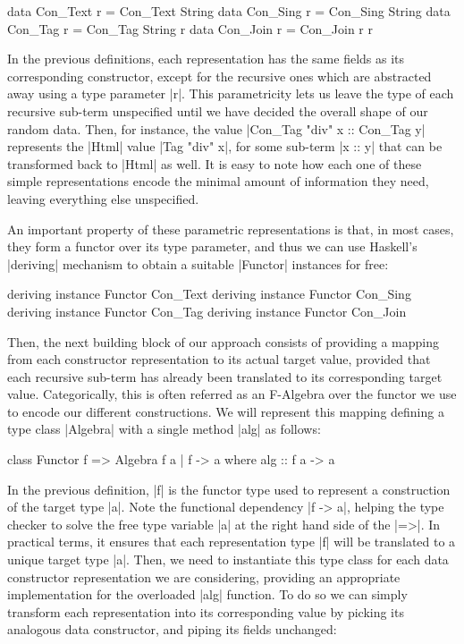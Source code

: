 \begin{code}
data Con_Text   r = Con_Text  String
data Con_Sing   r = Con_Sing  String
data Con_Tag    r = Con_Tag   String r
data Con_Join   r = Con_Join  r r
\end{code}
%
In the previous definitions, each representation has the same fields as its
corresponding constructor, except for the recursive ones which are abstracted
away using a type parameter |r|.
%
This parametricity lets us leave the type of each recursive sub-term unspecified
until we have decided the overall shape of our random data.
%
Then, for instance, the value |Con_Tag "div" x :: Con_Tag y| represents the
|Html| value |Tag "div" x|, for some sub-term |x :: y| that can be transformed
back to |Html| as well.
%
It is easy to note how each one of these simple representations encode the
minimal amount of information they need, leaving everything else unspecified.

An important property of these parametric representations is that, in most
cases, they form a functor over its type parameter, and thus we can use
Haskell's |deriving| mechanism to obtain a suitable |Functor| instances for
free:

\begin{code}
deriving instance Functor Con_Text
deriving instance Functor Con_Sing
deriving instance Functor Con_Tag
deriving instance Functor Con_Join
\end{code}


%
Then, the next building block of our approach consists of providing a mapping
from each constructor representation to its actual target value, provided that
each recursive sub-term has already been translated to its corresponding target
value.
%
Categorically, this is often referred as an F-Algebra over the functor we use to
encode our different constructions.
%
We will represent this mapping defining a type class |Algebra| with a single
method |alg| as follows:

\begin{code}
class Functor f => Algebra f a | f -> a where
  alg :: f a -> a
\end{code}
%
In the previous definition, |f| is the functor type used to represent a
construction of the target type |a|.
%
Note the functional dependency |f -> a|, helping the type checker to solve the
free type variable |a| at the right hand side of the |=>|.
%
In practical terms, it ensures that each representation type |f| will be
translated to a unique target type |a|.
%
Then, we need to instantiate this type class for each data constructor
representation we are considering, providing an appropriate implementation for
the overloaded |alg| function.
%
To do so we can simply transform each representation into its corresponding
value by picking its analogous data constructor, and piping its fields
unchanged:


